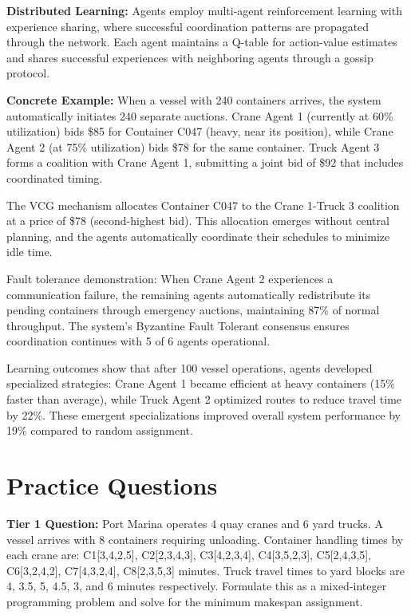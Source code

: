 \documentclass{article}
\begin{document}
\textbf{Distributed Learning:} Agents employ multi-agent reinforcement learning with experience sharing, where successful coordination patterns are propagated through the network. Each agent maintains a Q-table for action-value estimates and shares successful experiences with neighboring agents through a gossip protocol.

\textbf{Concrete Example:} When a vessel with 240 containers arrives, the system automatically initiates 240 separate auctions. Crane Agent 1 (currently at 60\% utilization) bids \$85 for Container C047 (heavy, near its position), while Crane Agent 2 (at 75\% utilization) bids \$78 for the same container. Truck Agent 3 forms a coalition with Crane Agent 1, submitting a joint bid of \$92 that includes coordinated timing.

The VCG mechanism allocates Container C047 to the Crane 1-Truck 3 coalition at a price of \$78 (second-highest bid). This allocation emerges without central planning, and the agents automatically coordinate their schedules to minimize idle time.

Fault tolerance demonstration: When Crane Agent 2 experiences a communication failure, the remaining agents automatically redistribute its pending containers through emergency auctions, maintaining 87\% of normal throughput. The system's Byzantine Fault Tolerant consensus ensures coordination continues with 5 of 6 agents operational.

Learning outcomes show that after 100 vessel operations, agents developed specialized strategies: Crane Agent 1 became efficient at heavy containers (15\% faster than average), while Truck Agent 2 optimized routes to reduce travel time by 22\%. These emergent specializations improved overall system performance by 19\% compared to random assignment.

\section{Practice Questions}

\textbf{Tier 1 Question:} Port Marina operates 4 quay cranes and 6 yard trucks. A vessel arrives with 8 containers requiring unloading. Container handling times by each crane are: C1[3,4,2,5], C2[2,3,4,3], C3[4,2,3,4], C4[3,5,2,3], C5[2,4,3,5], C6[3,2,4,2], C7[4,3,2,4], C8[2,3,5,3] minutes. Truck travel times to yard blocks are 4, 3.5, 5, 4.5, 3, and 6 minutes respectively. Formulate this as a mixed-integer programming problem and solve for the minimum makespan assignment.
\end{document}
